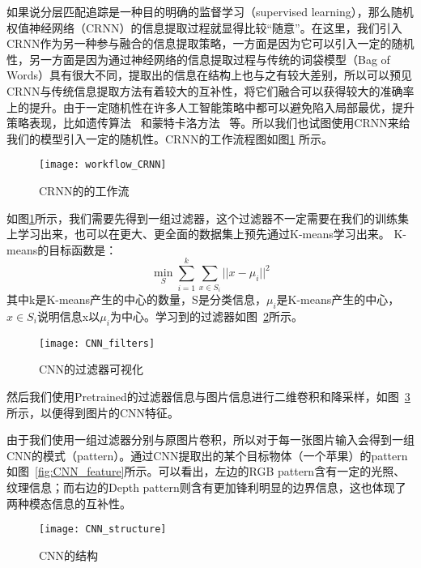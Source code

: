 如果说分层匹配追踪是一种目的明确的监督学习（supervised learning），那么随机权值神经网络（CRNN）的信息提取过程就显得比较“随意”。在这里，我们引入CRNN作为另一种参与融合的信息提取策略，一方面是因为它可以引入一定的随机性，另一方面是因为通过神经网络的信息提取过程与传统的词袋模型（Bag of Words）具有很大不同，提取出的信息在结构上也与之有较大差别，所以可以预见CRNN与传统信息提取方法有着较大的互补性，将它们融合可以获得较大的准确率上的提升。由于一定随机性在许多人工智能策略中都可以避免陷入局部最优，提升策略表现，比如遗传算法~ 和蒙特卡洛方法~ 等。所以我们也试图使用CRNN来给我们的模型引入一定的随机性。CRNN的工作流程图如图\ref{fig:workflow_CRNN} 所示。


\begin{figure}[H] %
  \centering
  \texttt{[image: workflow\_CRNN]}
  \caption{CRNN的的工作流}
  \label{fig:workflow_CRNN}
\end{figure}

如图\ref{fig:workflow_CRNN}所示，我们需要先得到一组过滤器，这个过滤器不一定需要在我们的训练集上学习出来，也可以在更大、更全面的数据集上预先通过K-means学习出来。
K-means的目标函数是：
\begin{equation}
\underset{S}{\min}\sum\limits_{i=1}^{k}{\sum\limits_{x \in S_i}{||x-\mu_i||^2}}
\end{equation}
其中k是K-means产生的中心的数量，S是分类信息，$\mu_i$是K-means产生的中心，$x \in S_i$说明信息x以$\mu_i$为中心。学习到的过滤器如图~\ref{fig:CNN_filters}所示。

\begin{figure}[H] %
  \centering
  \texttt{[image: CNN\_filters]}
  \caption{CNN的过滤器可视化}
  \label{fig:CNN_filters}
\end{figure}

然后我们使用Pretrained的过滤器信息与图片信息进行二维卷积和降采样，如图~\ref{fig:CNN_structure} 所示，以便得到图片的CNN特征。

由于我们使用一组过滤器分别与原图片卷积，所以对于每一张图片输入会得到一组CNN的模式（pattern）。通过CNN提取出的某个目标物体（一个苹果）的pattern如图~\ref{fig:CNN_feature}所示。可以看出，左边的RGB pattern含有一定的光照、纹理信息；而右边的Depth pattern则含有更加锋利明显的边界信息，这也体现了两种模态信息的互补性。

\begin{figure}[H] %
  \centering
  \texttt{[image: CNN\_structure]}
  \caption{CNN的结构}
  \label{fig:CNN_structure}
\end{figure}

